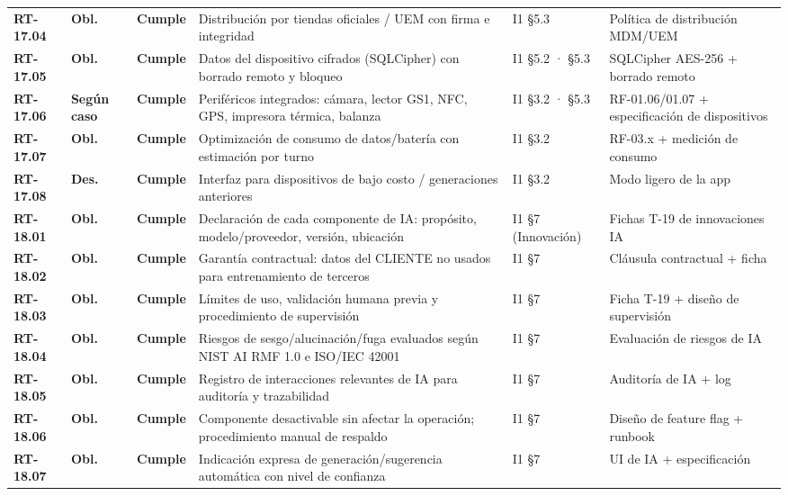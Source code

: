 \begin{small}
\begin{longtable}{@{}p{1.35cm} p{1.15cm} p{1.15cm} p{4.6cm} p{2.35cm} p{3.8cm}@{}}
\textbf{RT-17.04} & \textbf{Obl.} & \textbf{Cumple} & Distribuci\'on por tiendas oficiales / UEM con firma e integridad & I1 §5.3 & Pol\'itica de distribuci\'on MDM/UEM \\
\textbf{RT-17.05} & \textbf{Obl.} & \textbf{Cumple} & Datos del dispositivo cifrados (SQLCipher) con borrado remoto y bloqueo & I1 §5.2 · §5.3 & SQLCipher AES-256 + borrado remoto \\
\textbf{RT-17.06} & \textbf{Según caso} & \textbf{Cumple} & Perif\'ericos integrados: c\'amara, lector GS1, NFC, GPS, impresora t\'ermica, balanza & I1 §3.2 · §5.3 & RF-01.06/01.07 + especificaci\'on de dispositivos \\
\textbf{RT-17.07} & \textbf{Obl.} & \textbf{Cumple} & Optimizaci\'on de consumo de datos/bater\'ia con estimaci\'on por turno & I1 §3.2 & RF-03.x + medici\'on de consumo \\
\textbf{RT-17.08} & \textbf{Des.} & \textbf{Cumple} & Interfaz para dispositivos de bajo costo / generaciones anteriores & I1 §3.2 & Modo ligero de la app \\
\textbf{RT-18.01} & \textbf{Obl.} & \textbf{Cumple} & Declaraci\'on de cada componente de IA: prop\'osito, modelo/proveedor, versi\'on, ubicaci\'on & I1 §7 (Innovaci\'on) & Fichas T-19 de innovaciones IA \\
\textbf{RT-18.02} & \textbf{Obl.} & \textbf{Cumple} & Garant\'ia contractual: datos del CLIENTE no usados para entrenamiento de terceros & I1 §7 & Cl\'ausula contractual + ficha \\
\textbf{RT-18.03} & \textbf{Obl.} & \textbf{Cumple} & L\'imites de uso, validaci\'on humana previa y procedimiento de supervisi\'on & I1 §7 & Ficha T-19 + dise\~no de supervisi\'on \\
\textbf{RT-18.04} & \textbf{Obl.} & \textbf{Cumple} & Riesgos de sesgo/alucinaci\'on/fuga evaluados seg\'un NIST AI RMF 1.0 e ISO/IEC 42001 & I1 §7 & Evaluaci\'on de riesgos de IA \\
\textbf{RT-18.05} & \textbf{Obl.} & \textbf{Cumple} & Registro de interacciones relevantes de IA para auditor\'ia y trazabilidad & I1 §7 & Auditor\'ia de IA + log \\
\textbf{RT-18.06} & \textbf{Obl.} & \textbf{Cumple} & Componente desactivable sin afectar la operaci\'on; procedimiento manual de respaldo & I1 §7 & Dise\~no de feature flag + runbook \\
\textbf{RT-18.07} & \textbf{Obl.} & \textbf{Cumple} & Indicaci\'on expresa de generaci\'on/sugerencia autom\'atica con nivel de confianza & I1 §7 & UI de IA + especificaci\'on \\

\end{longtable}
\end{small}
